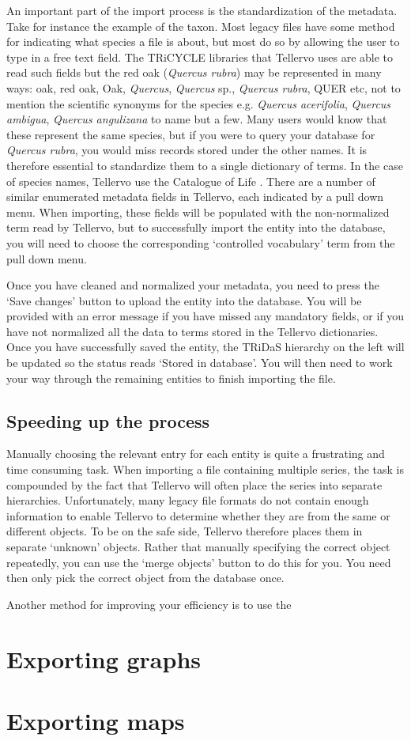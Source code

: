 An important part of the import process is the standardization of the metadata.  Take for instance the example of the taxon.  Most legacy files have some method for indicating what species a file is about, but most do so by allowing the user to type in a free text field.  The TRiCYCLE libraries that Tellervo uses are able to read such fields but the red oak (\textit{Quercus rubra}) may be represented in many ways: oak, red oak, Oak, \textit{Quercus}, \textit{Quercus} sp., \textit{Quercus rubra}, QUER etc, not to mention the scientific synonyms for the species e.g. \textit{Quercus acerifolia}, \textit{Quercus ambigua}, \textit{Quercus angulizana} to name but a few.  Many users would know that these represent the same species, but if you were to query your database for \textit{Quercus rubra}, you would miss records stored under the other names.  It is therefore essential to standardize them to a single dictionary of terms.  In the case of species names, Tellervo use the Catalogue of Life \citep{col}.  There are a number of similar enumerated metadata fields in Tellervo, each indicated by a pull down menu.  When importing, these fields will be populated with the non-normalized term read by Tellervo, but to successfully import the entity into the database, you will need to choose the corresponding `controlled vocabulary' term from the pull down menu.  

Once you have cleaned and normalized your metadata, you need to press the `Save changes' button to upload the entity into the database.  You will be provided with an error message if you have missed any mandatory fields, or if you have not normalized all the data to terms stored in the Tellervo dictionaries.  Once you have successfully saved the entity, the TRiDaS hierarchy on the left will be updated so the status reads `Stored in database'.  You will then need to work your way through the remaining entities to finish importing the file.

\subsection{Speeding up the process}
Manually choosing the relevant entry for each entity is quite a frustrating and time consuming task.  When importing a file containing multiple series, the task is compounded by the fact that Tellervo will often place the series into separate hierarchies.  Unfortunately, many legacy file formats do not contain enough information to enable Tellervo to determine whether they are from the same or different objects.  To be on the safe side, Tellervo therefore places them in separate `unknown' objects.  Rather that manually specifying the correct object repeatedly, you can use the `merge objects' button to do this for you.  You need then only pick the correct object from the database once.

Another method for improving your efficiency is to use the 



\section{Exporting graphs}



\section{Exporting maps}


